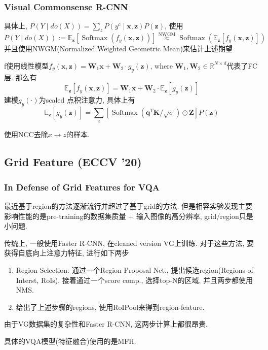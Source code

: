 \documentclass{beamer}
\begin{document}
\begin{frame}
    \frametitle{Visual Commonsense R-CNN}

    具体上, $P(Y \mid do(X)) = \sum_{z} P\left(y^{c} \mid \boldsymbol{x}, \boldsymbol{z}\right) P(\boldsymbol{z})$, 使用
    \begin{equation}
        P(Y \mid d o(X)):=\mathbb{E}_{\boldsymbol{z}}\left[\operatorname{Softmax}\left(f_{y}(\boldsymbol{x}, \boldsymbol{z})\right)\right]
        \stackrel{\mathrm{NWGM}}{\approx} \operatorname{Softmax}\left(\mathbb{E}_{\boldsymbol{z}}\left[f_{y}(\boldsymbol{x}, \boldsymbol{z})\right]\right)
    \end{equation}
    并且使用NWGM(Normalized Weighted Geometric Mean)来估计上述期望

    f使用线性模型$f_{y}(\boldsymbol{x}, \boldsymbol{z})=\boldsymbol{W}_{1} \boldsymbol{x}+\boldsymbol{W}_{2} \cdot g_{y}(\boldsymbol{z})$, where $\boldsymbol{W}_{1}, \boldsymbol{W}_{2} \in \mathbb{R}^{N \times d}$代表了FC层. 那么有
    \begin{equation}
        \mathbb{E}_{\boldsymbol{z}}\left[f_{y}(\boldsymbol{x}, \boldsymbol{z})\right]=\boldsymbol{W}_{1} \boldsymbol{x}+\boldsymbol{W}_{2} \cdot \mathbb{E}_{\boldsymbol{z}}\left[g_{y}(\boldsymbol{z})\right]
    \end{equation}
    建模$g_{y}(\cdot)$为scaled 点积注意力, 具体上有
    \begin{equation}
        \mathbb{E}_{\boldsymbol{z}}\left[g_{y}(\boldsymbol{z})\right]=\sum_{z}\left[\operatorname{Softmax}\left(\boldsymbol{q}^{T} \boldsymbol{K} / \sqrt{\sigma}\right) \odot \boldsymbol{Z}\right] P(\boldsymbol{z})
    \end{equation}

    使用NCC去除$x\to z$的样本.

\end{frame}

\subsection{Grid Feature (ECCV '20)}

\begin{frame}
    \frametitle{In Defense of Grid Features for VQA}

    最近基于region的方法逐渐流行并超过了基于grid的方法. 但是相容实验发现主要影响性能的是pre-training的数据集质量 + 输入图像的高分辨率, grid/region只是小问题.

    传统上, 一般使用Faster R-CNN, 在cleaned version VG上训练. 对于这些方法, 要获得自底向上注意力特征, 进行如下两步
    \begin{enumerate}
        \item Region Selection. 通过一个Region Proposal Net., 提出候选region(Regions of Interst, RoIs), 接着通过一个score comp., 选择top-N的区域, 并且两步都使用NMS.
        \item 给出了上述步骤的regions, 使用RoIPool来得到region-feature.
    \end{enumerate}
    由于VG数据集的复杂性和Faster R-CNN, 这两步计算上都很昂贵. 

    具体的VQA模型(特征融合)使用的是MFH.

\end{frame}
\end{document}

